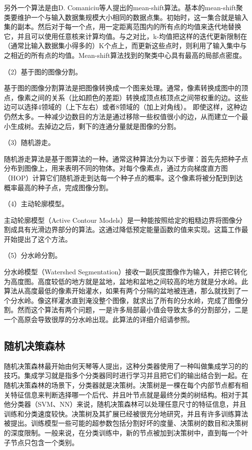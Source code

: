 \documentclass{article}
\begin{document}
另外一个算法是由D. Comaniciu等人提出的mean-shift算法\citep{1000236}。基本的mean-shift聚类要维护一个与输入数据集规模大小相同的数据点集。初始时，这一集合就是输入集的副本。然后对于每一个点，用一定距离范围内的所有点的均值来迭代地替换它，并且可以使用任意核来计算均值。与之对比，k-均值把这样的迭代更新限制在（通常比输入数据集小得多的）K个点上，而更新这些点时，则利用了输入集中与之相近的所有点的均值。Mean-shift算法找到的聚类中心具有最高的局部点密度。

（2）基于图的图像分割。

基于图的图像分割算法是把图像转换成一个图来处理。通常，像素转换成图中的顶点，像素之间的关系（比如颜色的差距）转换成顶点核顶点之间带权重的边。这些边可以选择4领域的（上下左右）或者8领域的（加上对角线）。
即使这样，这种边仍然太多。一种减少边数目的方法是通过移除一些权值很小的边，从而建立一个最小生成树。去掉边之后，剩下的连通分量就是图像的分割。


（3）随机游走。

随机游走算法是基于图算法的一种。通常这种算法分为以下步骤：首先先把种子点分布到图像上，用来表明不同的物体。对每个像素点，通过方向梯度直方图（HOP）计算它们随机游走到达每一个种子点的概率。这个像素将被分配到到达概率最高的种子点，完成图像分割。

（4）主动轮廓模型。

主动轮廓模型（Active Contour Models）是一种能按照给定的粗糙边界将图像分割成具有光滑边界部分的算法。这通过降低预定能量函数的值来实现。这篇工作最开始提出了这个方法\citep{Kass1988}。

（5）分水岭分割。

分水岭模型（Watershed Segmentation）接收一副灰度图像作为输入，并把它转化为高度图。高度较低的地方就是盆地，盆地和盆地之间较高的地方就是分水岭。此算法从高度最低的像素开始灌水，如果有两个分隔的盆地被连通，那么就找到了一个分水岭。像这样灌水直到淹没整个图像，就求出了所有的分水岭，完成了图像分割。然而这个算法有两个问题，一是许多局部最小值会导致太多的分割部分，二是一个高原会导致很厚的分水岭出现。此算法的详细介绍请参照\citep{10.5555/2372488.2372495}。

\subsection{随机决策森林}
随机决策森林最开始由何天琴等人提出\citep{598994}，这种分类器使用了一种叫做集成学习的的技巧。集成学习就是指多个分类器同时进行学习并且把它们的输出结合到一起。在随机决策森林的场景下，分类器就是决策树。决策树是一棵在每个内部节点都有相关特征信息来判断选择哪一个后代、并且叶节点就是最终分类的树结构。相对于其他分类器（SVM、NN）来说，随机决策森林可以处理任意尺寸的特征信息，并且训练和分类速度较快。决策树及其扩展已经被很充分地研究，并且有许多训练算法被提出。训练模型一些可能的超参数包括分割好坏的度量、决策树的数目和决策树的深度限制。一般来说，在分类训练中，新的节点被加到决策树中，直到每一个叶子节点只包含一个类别。
\end{document}
